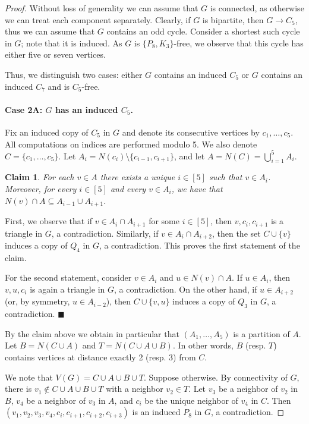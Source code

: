\documentclass[11pt,a4paper]{article}
\theoremstyle{mystyle}
\newtheorem{claim}{Claim}[theorem]
\newenvironment{claimproof}{\noindent {\emph{Proof of Claim.}}}{\hfill$\blacksquare$\medskip}
\begin{document}
\begin{proof}
Without loss of generality we can assume that $G$ is connected, as otherwise we can treat each component separately.
Clearly, if $G$ is bipartite, then $G \to C_5$, thus we can assume that $G$ contains an odd cycle.
Consider a shortest such cycle in $G$; note that it is induced.
As $G$ is $\{P_8,K_3\}$-free, we observe that this cycle has either five or seven vertices.

Thus, we distinguish two cases: either $G$ contains an induced $C_5$ or $G$ contains an induced $C_7$ and is $C_5$-free.


\paragraph{Case 2A: $G$ has an induced $C_5$.}
Fix an induced copy of $C_5$ in $G$ and denote its consecutive vertices by $c_1,\ldots,c_5$. All computations on indices are performed modulo 5.
We also denote $C = \{c_1,\ldots,c_5\}$.
Let $A_i=N(c_i) \setminus \{c_{i-1},c_{i+1}\}$, and let $A=N(C) = \bigcup_{i = 1}^5 A_i$.

\begin{claim}\label{cla:a-neighbor}
For each $v \in A$ there exists a unique $i \in [5]$ such that $v \in A_i$.
Moreover, for every $i \in [5]$ and every $v \in A_i$, we have that $N(v) \cap A \subseteq A_{i-1} \cup A_{i+1}$. 
\end{claim}
\begin{claimproof}
First, we observe that if $v \in A_i \cap A_{i+1}$ for some $i \in [5]$, then $v,c_i,c_{i+1}$ is a triangle in $G$, a contradiction. 
Similarly, if $v \in A_i \cap A_{i+2}$, then the set $C \cup \{v\}$ induces a copy of $Q_4$ in $G$, a contradiction.
This proves the first statement of the claim.

For the second statement, consider $v \in A_i$ and $u \in N(v) \cap A$. 
If $u \in A_i$, then $v,u,c_i$ is again a triangle in $G$, a contradiction.
On the other hand, if $u \in A_{i+2}$ (or, by symmetry, $u \in A_{i-2}$), then $C \cup \{v,u\}$ induces a copy of $Q_3$ in $G$, a contradiction.
\end{claimproof}

By the claim above we obtain in particular that $(A_1,\ldots,A_5)$ is a partition of $A$.
Let $B = N(C \cup A)$ and $T = N(C \cup A \cup B)$. In other words, $B$ (resp. $T$) contains vertices at distance exactly 2 (resp. 3) from $C$.

We note that $V(G) = C \cup A \cup B \cup T$. Suppose otherwise. By connectivity of $G$, there is $v_1 \notin C \cup A \cup B \cup T$ with a neighbor $v_2 \in T$.
Let $v_3$ be a neighbor of $v_2$ in $B$, $v_4$ be a neighbor of $v_3$ in $A$, and $c_i$ be the unique neighbor of $v_4$ in $C$.
Then $(v_1,v_2,v_3,v_4,c_i, c_{i+1},c_{i+2},c_{i+3})$ is an induced $P_8$ in $G$, a contradiction.


\end{proof}
\end{document}
